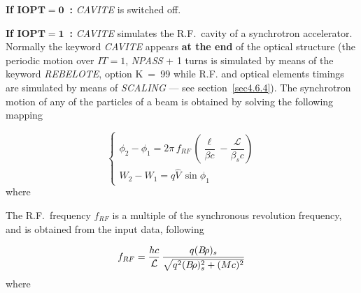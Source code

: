 \noindent\textbf{If $\mathbf{IOPT  =  0}$~:}   \textsl{CAVITE} is switched off.  
\bigskip

\noindent\textbf{If $\mathbf{IOPT  =  1}$~:}  \textsl{CAVITE} simulates the R.F.~cavity of a 
synchrotron 
accelerator. Normally the keyword \textsl{CAVITE} appears \textbf{at the end} of the optical 
structure (the periodic motion over $IT  = 1$, \textsl{NPASS} + 1 
turns is simulated by means of the keyword \textsl{REBELOTE}, option 
\mbox{K  =  99} while  R.F.  and optical elements  timings are simulated by means of
\textsl{SCALING} --- see section~\ref{sec4.6.4}). The synchrotron motion of any of the 
\IMAX{} particles of a beam is obtained by solving the following mapping 

$$ \left\{ 
\begin{array}{l}
	\phi_ 2-\phi_ 1= 2\pi \, f_{RF}\, 
	     \left(  \dfrac{\ell}{ \beta c} - \dfrac{\mathcal{L} }{ \beta_sc} \right) \\
	W_2-W_1 = q\hat  V\, \sin\phi_ 1  
\end{array}
\right. $$
%
 where
  
{\renewcommand{\arraystretch}{1}
 }
\bigskip

\noindent The R.F.\ frequency $ f_{RF} $ is a multiple of the synchronous 
revolution frequency, and is obtained from the input data, following 

$$ f_{RF} = \frac{hc }{\mathcal{L}}\, \frac{q(B\!\rho )_s }{ \sqrt{q^2(B\!\rho)^2_s+(Mc)^2}} $$
%
 where
  
